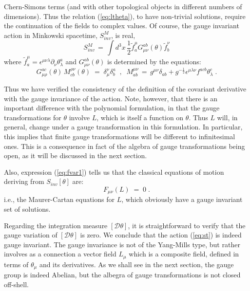 \documentclass[a4paper,12pt]{article}
\begin{document}
Chern-Simons terms (and with other topological objects in different
numbers of dimensions).  Thus the relation (\ref{eq:ltheta}), to have
non-trivial solutions, require the continuation of the fields to
complex values.  Of course, the gauge invariant action in Minkowski
spacetime, $S_{inv}^M$, is real,
\begin{equation}\label{eq:mink}
S_{inv}^M \,=\, \int d^3x \,\frac{1}{2} {\tilde f}^\mu_a
G_{\mu\nu}^{ab}(\theta){\tilde f}^\nu_b
\end{equation}
where ${\tilde f}^\mu_a = \epsilon^{\mu\nu\lambda}\partial_\nu
\theta_\lambda^a$ and $G_{\mu\nu}^{ab}(\theta)$ is determined by
the equations:
\begin{equation}\label{eq:defgm}
G_{\mu\rho}^{ac}(\theta)\, M^{\rho\nu}_{cb}(\theta) \;=\;
\delta_\mu^\nu \delta^a_b 
\;\;,\;\;
M^{\mu\nu}_{ab}\,=\, g^{\mu\nu}\delta_{ab} +  g^{-\frac{1}{2}}
\epsilon^{\mu\lambda\nu} f^{acb} \theta_\lambda^c\;.
\end{equation}


Thus we have verified the consistency of the definition of the
covariant derivative with the gauge invariance of the action. Note,
however, that there is an important difference with the polynomial
formulation, in that the gauge transformations for $\theta$ involve
$L$, which is itself a function on $\theta$.  Thus $L$ will, in
general, change under a gauge transformation in this formulation. In
particular, this implies that finite gauge transformations will be
different to infinitesimal ones. This is a consequence in fact of the
algebra of gauge transformations being open, as it will be discussed
in the next section.


Also, expression (\ref{eq:fvar1}) tells us that the classical
equations of motion deriving from $S_{inv}[\theta]$ are:
\begin{equation}\label{eq:mc}
F_{\mu\nu}(L) \;=\; 0 \;.
\end{equation}
i.e., the Maurer-Cartan equations for $L$, which obviously have a
gauge invariant set of solutions.  

Regarding the integration measure $[{\mathcal D}\theta]$, it is
straightforward to verify that the gauge variation of $[{\mathcal
  D}\theta]$ is zero.  We conclude that the action (\ref{eq:st}) is
indeed gauge invariant.  The gauge invariance is not of the Yang-Mills
type, but rather involves as a connection a vector field $L_\mu$ which
is a composite field, defined in terms of $\theta_\mu$ and its
derivatives.  As we shall see in the next section, the gauge group is
indeed Abelian, but the albegra of gauge transformations is not closed
off-shell.
 
\end{document}
